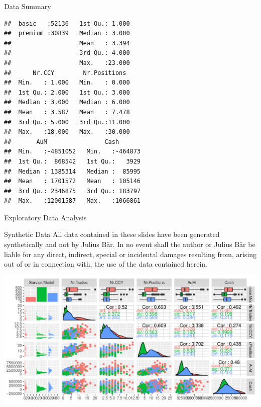 \documentclass{beamer}\usepackage[]{graphicx}\usepackage[]{color}
\makeatletter
\newenvironment{kframe}{%
 \def\at@end@of@kframe{}%
 \ifinner\ifhmode%
  \def\at@end@of@kframe{\end{minipage}}%
  \begin{minipage}{\columnwidth}%
 \fi\fi%
 \def\FrameCommand##1{\hskip\@totalleftmargin \hskip-\fboxsep
 \colorbox{shadecolor}{##1}\hskip-\fboxsep
     \hskip-\linewidth \hskip-\@totalleftmargin \hskip\columnwidth}%
 \MakeFramed {\advance\hsize-\width
   \@totalleftmargin\z@ \linewidth\hsize
   \@setminipage}}%
 {\par\unskip\endMakeFramed%
 \at@end@of@kframe}
\newenvironment{knitrout}{}{} %
\makeatother
\begin{document}
\begin{frame}[fragile]{Data Summary}
\begin{minipage}[t]{0.45\textwidth}
\begin{knitrout}
\begin{kframe}
\begin{verbatim}
##  basic   :52136   1st Qu.: 1.000  
##  premium :30839   Median : 3.000  
##                   Mean   : 3.394  
##                   3rd Qu.: 4.000  
##                   Max.   :23.000  
##      Nr.CCY        Nr.Positions   
##  Min.   : 1.000   Min.   : 0.000  
##  1st Qu.: 2.000   1st Qu.: 3.000  
##  Median : 3.000   Median : 6.000  
##  Mean   : 3.587   Mean   : 7.478  
##  3rd Qu.: 5.000   3rd Qu.:11.000  
##  Max.   :18.000   Max.   :30.000  
##       AuM                Cash        
##  Min.   :-4851052   Min.   :-464873  
##  1st Qu.:  868542   1st Qu.:   3929  
##  Median : 1385314   Median :  85995  
##  Mean   : 1701572   Mean   : 105146  
##  3rd Qu.: 2346875   3rd Qu.: 183797  
##  Max.   :12001587   Max.   :1066861
\end{verbatim}
\end{kframe}
\end{knitrout}
\end{minipage}
\end{frame}
\begin{frame}[fragile]{Exploratory Data Analysis}
\tiny

{
\begin{block}{\tiny Synthetic Data}
All data contained in these slides have been generated synthetically and not by Julius B\"{a}r. In no event shall the author or Julius B\"{a}r be liable for any direct, indirect, special or incidental damages resulting from, arising out of or in connection with, the use of the data contained herein.
\end{block}
}
\begin{knitrout}
\color{fgcolor}
\includegraphics[width=\linewidth]{figure/plots_ggpairs-1} 

\end{knitrout}


\end{frame}
\end{document}
